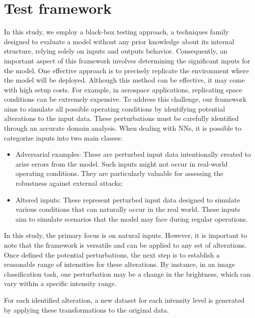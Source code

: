 \section{Test framework}

In this study, we employ a black-box testing approach, a techniques family designed to evaluate a model without any prior knowledge about its internal structure, relying solely on inputs and outputs behavior.
Consequently, an important aspect of this framework involves determining the significant inputs for the model. One effective approach is to precisely replicate the environment where the model will be deployed. Although this method can be effective, it may come with high setup costs. For example, in aerospace applications, replicating space conditions can be extremely expensive.
To address this challenge, our framework aims to simulate all possible operating conditions by identifying potential alterations to the input data. These perturbations must be carefully identified through an accurate domain analysis.
When dealing with NNs, it is possible to categorize inputs into two main classes:
\begin{itemize}
	\item Adversarial examples: These are perturbed input data intentionally created to arise errors from the model. Such inputs might not occur in real-world operating conditions. They are particularly valuable for assessing the robustness against external attacks;
	\item Altered inputs: These represent perturbed input data designed to simulate various conditions that can naturally occur in the real world. These inputs aim to simulate scenarios that the model may face during regular operations.
\end{itemize}

In this study, the primary focus is on natural inputs. However, it is important to note that the framework is versatile and can be applied to any set of alterations. Once defined the potential perturbations, the next step is to establish a reasonable range of intensities for these alterations. By instance, in an image classification task, one perturbation may be a change in the brightness, which can vary within a specific intensity range.

For each identified alteration, a new dataset for each intensity level is generated by applying these transformations to the original data.

